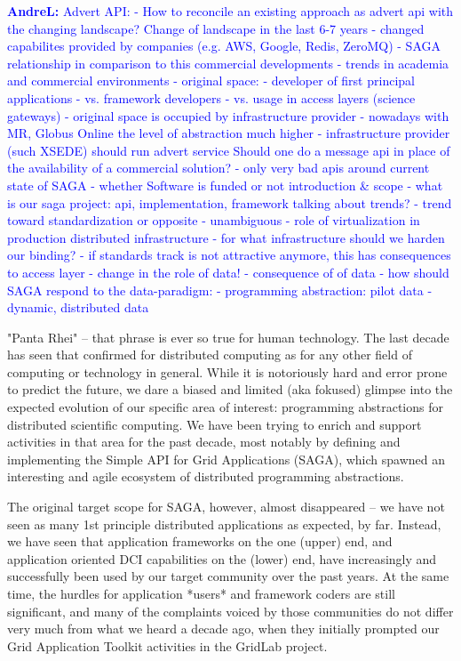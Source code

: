 \documentclass{article}
\newcommand{\B}[1]{\textbf{#1}}
\newcommand{\alnote}[1]{{\textcolor{blue}{    \B{AndreL:  } #1 }}}
\newcommand{\alnote}[1]{}
\begin{document}
\alnote{
Advert API:
- How to reconcile an existing approach as advert api with the changing landscape?
Change of landscape in the last 6-7 years
- changed capabilites provided by companies (e.g. AWS, Google, Redis, ZeroMQ)
- SAGA relationship in comparison to this commercial developments
- trends in academia and commercial environments
- original space:
     - developer of first principal applications
     - vs. framework developers
     - vs. usage in access layers (science gateways)
- original space is occupied by infrastructure provider
- nowadays with MR, Globus Online the level of abstraction much higher
- infrastructure provider (such XSEDE) should run advert service 
Should one do a message api in place of the availability of a commercial solution?
- only very bad apis around
current state of SAGA 
- whether Software is funded or not
introduction \& scope
- what is our saga project: api, implementation, framework
talking about trends?
- trend toward standardization or opposite
- unambiguous
- role of virtualization in production distributed infrastructure
- for what infrastructure should we harden our binding?
- if standards track is not attractive anymore, this has consequences to access layer
- change in the role of data!
- consequence of of data
- how should SAGA respond to the data-paradigm:
     - programming abstraction: pilot data
     - dynamic, distributed data
}

 "Panta Rhei" -- that phrase is ever so true for human technology.
 The last decade has seen that confirmed for distributed computing as
 for any other field of computing or technology in general.  While it
 is notoriously hard and error prone to predict the future, we dare a
 biased and limited (aka fokused) glimpse into the expected evolution
 of our specific area of interest: programming abstractions for
 distributed scientific computing.  We have been trying to enrich and
 support activities in that area for the past decade, most notably by
 defining and implementing the Simple API for Grid Applications
 (SAGA), which spawned an interesting and agile ecosystem of
 distributed programming abstractions.

 The original target scope for SAGA, however, almost disappeared -- we
 have not seen as many 1st principle distributed applications as
 expected, by far.  Instead, we have seen that application frameworks
 on the one (upper) end, and application oriented DCI capabilities on
 the (lower) end, have increasingly and successfully been used by our
 target community over the past years.  At the same time, the hurdles
 for application *users* and framework coders are still significant,
 and many of the complaints voiced by those communities do not differ
 very much from what we heard a decade ago, when they initially
 prompted our Grid Application Toolkit activities in the GridLab
 project.
\end{document}
